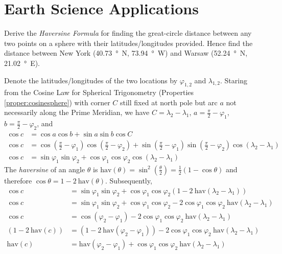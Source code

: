 \section{Earth Science Applications}
\begin{exmp}
\label{exmp:Haversine}
Derive the \textit{Haversine Formula} for finding the great-circle distance between any two points on a sphere with their latitudes/longitudes provided. Hence find the distance between New York (\SI{40.73}{\degree N}, \SI{73.94}{\degree W}) and Warsaw (\SI{52.24}{\degree N}, \SI{21.02}{\degree E}).
\end{exmp}
\begin{solution}
Denote the latitudes/longitudes of the two locations by $\varphi_{1,2}$ and $\lambda_{1,2}$. Staring from the Cosine Law for Spherical Trigonometry (Properties \ref{proper:cosinesphere}) with corner $C$ still fixed at north pole but arc $a$ not necessarily along the Prime Meridian, we have $C = \lambda_2 - \lambda_1$, $a = \frac{\pi}{2} - \varphi_1$, $b = \frac{\pi}{2} - \varphi_2$, and
\begin{align*}
\cos c &= \cos a \cos b + \sin a \sin b \cos C \\
\cos c &= \cos (\frac{\pi}{2} - \varphi_1) \cos (\frac{\pi}{2} - \varphi_2) + \sin (\frac{\pi}{2} - \varphi_1) \sin (\frac{\pi}{2} - \varphi_2) \cos (\lambda_2 - \lambda_1) \\
\cos c &= \sin \varphi_1 \sin \varphi_2 + \cos \varphi_1 \cos \varphi_2 \cos (\lambda_2 - \lambda_1)
\end{align*}
The \textit{haversine} of an angle $\theta$ is $\text{hav}(\theta) = \sin^2 (\frac{\theta}{2}) = \frac{1}{2}(1-\cos\theta)$ and therefore $\cos\theta = 1 - 2\ \text{hav}(\theta)$. Subsequently,
\begin{align*}
\cos c &= \sin \varphi_1 \sin \varphi_2 + \cos \varphi_1 \cos \varphi_2 (1 - 2\ \text{hav}(\lambda_2 - \lambda_1)) \\ 
\cos c &= \sin \varphi_1 \sin \varphi_2 + \cos \varphi_1 \cos \varphi_2 - 2 \cos \varphi_1 \cos \varphi_2\ \text{hav}(\lambda_2 - \lambda_1) \\
\cos c &= \cos(\varphi_2 - \varphi_1) - 2 \cos \varphi_1 \cos \varphi_2\ \text{hav}(\lambda_2 - \lambda_1) \\
(1 - 2\ \text{hav}(c)) &= (1 - 2\ \text{hav}(\varphi_2 - \varphi_1)) - 2 \cos \varphi_1 \cos \varphi_2\ \text{hav}(\lambda_2 - \lambda_1) \\
\text{hav}(c) &= \text{hav}(\varphi_2 - \varphi_1) + \cos \varphi_1 \cos \varphi_2\ \text{hav}(\lambda_2 - \lambda_1)

\end{align*}
\end{solution}
